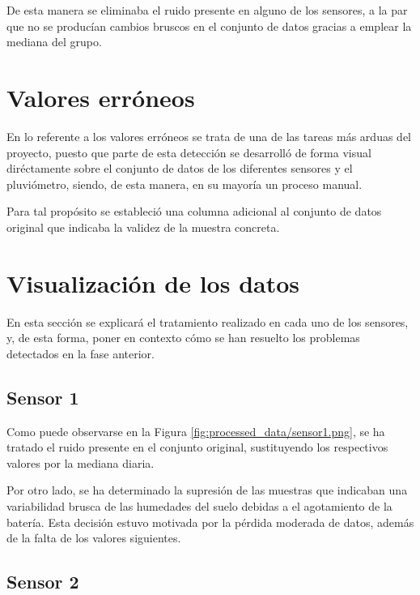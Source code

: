 
De esta manera se eliminaba el ruido presente en alguno de los sensores, a la par 
que no se producían cambios bruscos en el conjunto de datos gracias a emplear la 
mediana del grupo.

\section{Valores erróneos}
En lo referente a los valores erróneos se trata de una de las tareas más arduas 
del proyecto, puesto que parte de esta detección se desarrolló de forma visual diréctamente
sobre el conjunto de datos de los diferentes sensores y el pluviómetro, siendo, 
de esta manera, en su mayoría un proceso manual.

Para tal propósito se estableció una columna adicional al conjunto de datos original
que indicaba la validez de la muestra concreta.

\section{Visualización de los datos}
En esta sección se explicará el tratamiento realizado en cada uno de los sensores, y,
de esta forma, poner en contexto cómo se han resuelto los problemas detectados
en la fase anterior.

\subsection{Sensor 1}

Como puede observarse en la Figura \ref{fig:processed_data/sensor1.png}, 
se ha tratado el ruido presente en el conjunto original, sustituyendo los 
respectivos valores por la mediana diaria.

Por otro lado, se ha determinado la supresión de las muestras que indicaban una 
variabilidad brusca de las humedades del suelo debidas a el agotamiento de la batería.
Esta decisión estuvo motivada por la pérdida moderada de datos, además de la 
falta de los valores siguientes.

\newpage

\subsection{Sensor 2}

